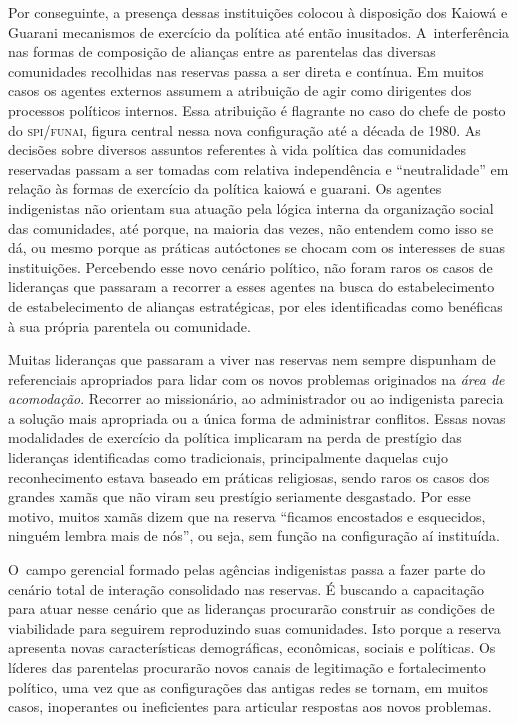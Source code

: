 Por conseguinte, a presença dessas instituições colocou à disposição dos
Kaiowá e Guarani mecanismos de exercício da política até então
inusitados. A~interferência nas formas de composição de alianças entre
as parentelas das diversas comunidades recolhidas nas reservas passa a
ser direta e contínua. Em muitos casos os agentes externos assumem a
atribuição de agir como dirigentes dos processos políticos internos.
Essa atribuição é flagrante no caso do chefe de posto do \textsc{spi}/\textsc{funai},
figura central nessa nova configuração até a década de 1980. As
decisões sobre diversos assuntos referentes à vida política das
comunidades reservadas passam a ser tomadas com relativa independência
e ``neutralidade'' em relação às formas de exercício da política kaiowá e
guarani. Os agentes indigenistas não orientam sua atuação pela lógica
interna da organização social das comunidades, até porque, na maioria
das vezes, não entendem como isso se dá, ou mesmo porque as práticas
autóctones se chocam com os interesses de suas instituições. Percebendo
esse novo cenário político, não foram raros os casos de lideranças que
passaram a recorrer a esses agentes na busca do estabelecimento de estabelecimento de alianças
estratégicas, por eles identificadas como benéficas à sua própria
parentela ou comunidade.

Muitas lideranças que passaram a viver nas reservas nem sempre dispunham
de referenciais apropriados para lidar com os novos problemas
originados na \emph{área de acomodação}. Recorrer ao missionário, ao
administrador ou ao indigenista parecia a solução mais apropriada ou a
única forma de administrar conflitos. Essas novas modalidades de
exercício da política implicaram na perda de prestígio das lideranças
identificadas como tradicionais, principalmente daquelas cujo
reconhecimento estava baseado em práticas religiosas, sendo raros os
casos dos grandes xamãs que não viram seu prestígio seriamente
desgastado. Por esse motivo, muitos xamãs dizem que na reserva ``ficamos
encostados e esquecidos, ninguém lembra mais de nós'', ou seja, sem
função na configuração aí instituída.

O~campo gerencial formado pelas agências indigenistas passa a fazer
parte do cenário total de interação consolidado nas reservas. É
buscando a capacitação para atuar nesse cenário que as lideranças
procurarão construir as condições de viabilidade para seguirem
reproduzindo suas comunidades. Isto porque a reserva apresenta novas
características demográficas, econômicas, sociais e políticas. Os
líderes das parentelas procurarão novos canais de legitimação e
fortalecimento político, uma vez que as configurações das antigas redes
se tornam, em muitos casos, inoperantes ou ineficientes para articular
respostas aos novos problemas. 

